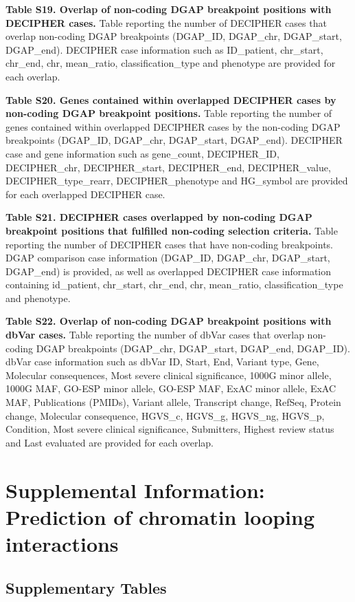 \documentclass[a4paper,twoside=true,openright,parskip=full,chapterprefix=true,11pt,headings=normal,bibliography=totoc,listof=totoc,titlepage=on,captions=tableabove,draft=false]{scrreprt}
\theoremstyle{definition}
\theoremstyle{definition}
\theoremstyle{definition}
\theoremstyle{remark}
\begin{document}
\textbf{Table S19. Overlap of non-coding DGAP breakpoint positions with
DECIPHER cases.} Table reporting the number of DECIPHER cases that
overlap non-coding DGAP breakpoints (DGAP\_ID, DGAP\_chr, DGAP\_start,
DGAP\_end). DECIPHER case information such as ID\_patient, chr\_start,
chr\_end, chr, mean\_ratio, classification\_type and phenotype are
provided for each overlap.

\textbf{Table S20. Genes contained within overlapped DECIPHER cases by
non-coding DGAP breakpoint positions.} Table reporting the number of
genes contained within overlapped DECIPHER cases by the non-coding DGAP
breakpoints (DGAP\_ID, DGAP\_chr, DGAP\_start, DGAP\_end). DECIPHER case
and gene information such as gene\_count, DECIPHER\_ID, DECIPHER\_chr,
DECIPHER\_start, DECIPHER\_end, DECIPHER\_value, DECIPHER\_type\_rearr,
DECIPHER\_phenotype and HG\_symbol are provided for each overlapped
DECIPHER case.

\textbf{Table S21. DECIPHER cases overlapped by non-coding DGAP
breakpoint positions that fulfilled non-coding selection criteria.}
Table reporting the number of DECIPHER cases that have non-coding
breakpoints. DGAP comparison case information (DGAP\_ID, DGAP\_chr,
DGAP\_start, DGAP\_end) is provided, as well as overlapped DECIPHER case
information containing id\_patient, chr\_start, chr\_end, chr,
mean\_ratio, classification\_type and phenotype.

\textbf{Table S22. Overlap of non-coding DGAP breakpoint positions with
dbVar cases.} Table reporting the number of dbVar cases that overlap
non-coding DGAP breakpoints (DGAP\_chr, DGAP\_start, DGAP\_end,
DGAP\_ID). dbVar case information such as dbVar ID, Start, End, Variant
type, Gene, Molecular consequences, Most severe clinical significance,
1000G minor allele, 1000G MAF, GO-ESP minor allele, GO-ESP MAF, ExAC
minor allele, ExAC MAF, Publications (PMIDs), Variant allele, Transcript
change, RefSeq, Protein change, Molecular consequence, HGVS\_c, HGVS\_g,
HGVS\_ng, HGVS\_p, Condition, Most severe clinical significance,
Submitters, Highest review status and Last evaluated are provided for
each overlap.

\hypertarget{loop-support}{%
\chapter{Supplemental Information: Prediction of chromatin looping
interactions}\label{loop-support}}

\hypertarget{LoopPredSupTab}{%
\section{Supplementary Tables}\label{LoopPredSupTab}}
\end{document}
